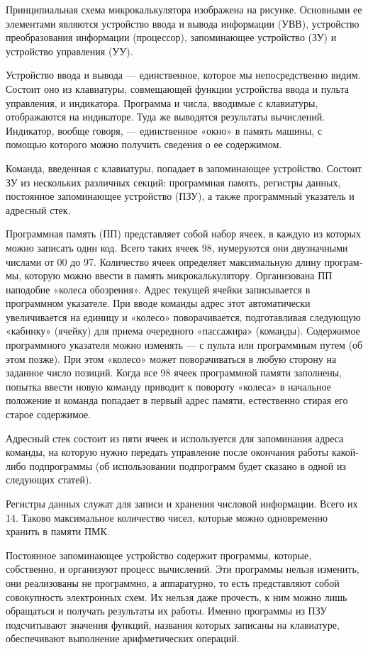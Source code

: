 \documentclass[11pt,a4paper,oneside]{article}
\begin{document}
Принципиальная схема микрокаль­кулятора изображена на рисунке. Основными ее элементами являются устройство ввода и вывода информа­ции (УВВ), устройство преобразова­ния информации (процессор), запо­минающее устройство (ЗУ) и устрой­ство управления (УУ).

Устройство ввода и вывода — един­ственное, которое мы непосредствен­но видим. Состоит оно из клавиату­ры, совмещающей функции устрой­ства ввода и пульта управления, и индикатора. Программа и числа, вво­димые с клавиатуры, отображаются на индикаторе. Туда же выводятся результаты вычислений. Индикатор, вообще говоря, — единственное «ок­но» в память машины, с помощью которого можно получить сведения о ее содержимом.

Команда, введенная с клавиатуры, попадает в запоминающее устройство. Состоит ЗУ из нескольких различных секций: программная па­мять, регистры данных, постоянное запоминающее устройство (ПЗУ), а также программный указатель и ад­ресный стек.

Программная память (ПП) пред­ставляет собой набор ячеек, в каж­дую из которых можно записать один код. Всего таких ячеек 98, ну­меруются они двузначными числами  от 00 до 97. Количество ячеек опре­деляет максимальную длину програм­мы, которую можно ввести в память микрокалькулятору. Организована ПП наподобие «колеса обозрения». Адрес текущей ячейки записывается в программном указателе. При вво­де команды адрес этот автоматиче­ски увеличивается на единицу и «ко­лесо» поворачивается, подготавливая следующую «кабинку» (ячейку) для приема очередного «пассажира» (команды). Содержимое программно­го указателя можно изменять — с пульта или программным путем (об этом позже). При этом «колесо» мо­жет поворачиваться в любую сторо­ну на заданное число позиций. Ко­гда все 98 ячеек программной памя­ти заполнены, попытка ввести новую команду приводит к повороту «ко­леса» в начальное положение и команда попадает в первый адрес памяти, естественно стирая его ста­рое содержимое.

Адресный стек состоит из пяти ячеек и используется для запомина­ния адреса команды, на которую нужно передать управление после окончания работы какой-либо под­программы (об использовании под­программ будет сказано в одной из следующих статей).

Регистры данных служат для за­писи и хранения числовой информа­ции. Всего их 14. Таково максималь­ное количество чисел, которые мож­но одновременно хранить в памяти ПМК.

Постоянное запоминающее устрой­ство содержит программы, которые, собственно, и организуют процесс вычислений. Эти программы нельзя изменить, они реализованы не про­граммно, а аппаратурно, то есть представляют собой совокупность электронных схем. Их нельзя даже прочесть, к ним можно лишь обра­щаться и получать результаты их ра­боты. Именно программы из ПЗУ подсчитывают значения функций, названия которых записаны на кла­виатуре, обеспечивают выполнение арифметических операций.
\end{document}

